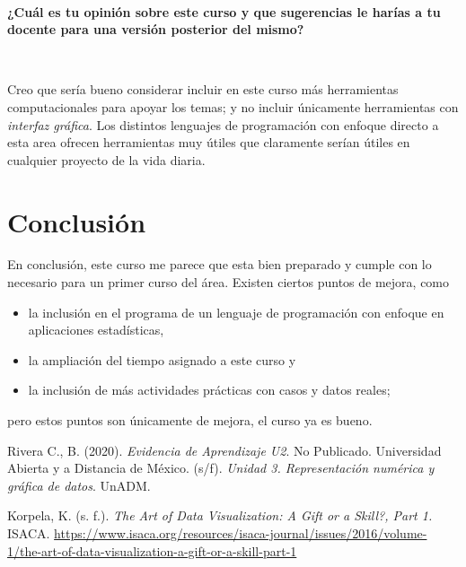 \documentclass[12pt]{article}
\begin{document}
\par \ \\ \noindent
\textbf{¿Cuál es tu opinión sobre este curso y que sugerencias le harías a tu docente para una versión posterior del mismo?}

\par \
\par Creo que sería bueno considerar incluir en este curso más herramientas computacionales para apoyar los temas; y no incluir únicamente herramientas con \textit{interfaz gráfica}. Los distintos lenguajes de programación con enfoque directo a esta area ofrecen herramientas muy útiles que claramente serían útiles en cualquier proyecto de la vida diaria.




\section*{Conclusión}

\par En conclusión, este curso me parece que esta bien preparado y cumple con lo necesario para un primer curso del área. Existen ciertos puntos de mejora, como
	\begin{itemize}
		\item la inclusión en el programa de un lenguaje de programación con enfoque en aplicaciones estadísticas,
		\item la ampliación del tiempo asignado a este curso y
		\item la inclusión de más actividades prácticas con casos y datos reales;
	\end{itemize}
	
	\noindent pero estos puntos son únicamente de mejora, el curso ya es bueno.


\begin{thebibliography}{X}
	 Rivera C., B. (2020). \textit{Evidencia de Aprendizaje U2}. No Publicado.
	\bibitem{basico} Universidad Abierta y a Distancia de México. (s/f). \textit{Unidad 3. Representación numérica y gráfica de datos}. UnADM.

	 Korpela, K. (s. f.). \textit{The Art of Data Visualization: A Gift or a Skill?, Part 1. } ISACA. \url{https://www.isaca.org/resources/isaca-journal/issues/2016/volume-1/the-art-of-data-visualization-a-gift-or-a-skill-part-1}
 
\end{thebibliography}
\end{document}
